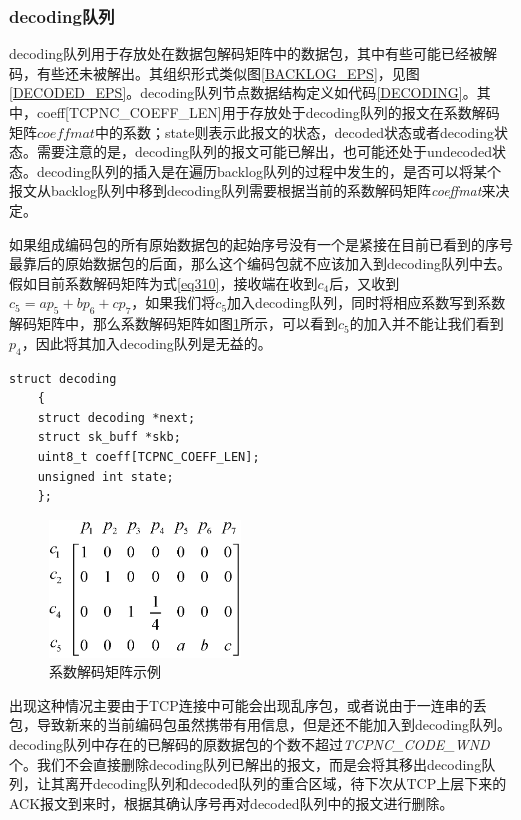 \subsubsection{\textbf{decoding队列}}
decoding队列用于存放处在数据包解码矩阵中的数据包，其中有些可能已经被解码，有些还未被解出。其组织形式类似图\ref{BACKLOG_EPS}，见图\ref{DECODED_EPS}。decoding队列节点数据结构定义如代码\ref{DECODING}。其中，coeff[TCPNC\_COEFF\_LEN]用于存放处于decoding队列的报文在系数解码矩阵$coeffmat$中的系数；state则表示此报文的状态，decoded状态或者decoding状态。需要注意的是，decoding队列的报文可能已解出，也可能还处于undecoded状态。decoding队列的插入是在遍历backlog队列的过程中发生的，是否可以将某个报文从backlog队列中移到decoding队列需要根据当前的系数解码矩阵\emph{coeffmat}来决定。
\par
如果组成编码包的所有原始数据包的起始序号没有一个是紧接在目前已看到的序号最靠后的原始数据包的后面，那么这个编码包就不应该加入到decoding队列中去。假如目前系数解码矩阵为式\ref{eq310}，接收端在收到$c_4$后，又收到$c_5=ap_{5}+bp_{6}+cp_{7}$，如果我们将$c_5$加入decoding队列，同时将相应系数写到系数解码矩阵中，那么系数解码矩阵如图\ref{IFADD_EPS}所示，可以看到$c_5$的加入并不能让我们看到$p_{4}$，因此将其加入decoding队列是无益的。
	\begin{lstlisting}[float,caption=decoding链表节点数据结构,label={DECODING},language={[ANSI]C}]
	struct decoding
	{
	struct decoding *next;
	struct sk_buff *skb;		
	uint8_t coeff[TCPNC_COEFF_LEN];
	unsigned int state;
	};
	\end{lstlisting}
\begin{figure}[htbp]
	\centering
	\includegraphics[width=2in]{figures/ifadd.eps}
	\caption{系数解码矩阵示例}
	\label{IFADD_EPS}
\end{figure}
出现这种情况主要由于TCP连接中可能会出现乱序包，或者说由于一连串的丢包，导致新来的当前编码包虽然携带有用信息，但是还不能加入到decoding队列。decoding队列中存在的已解码的原数据包的个数不超过\emph{TCPNC\_CODE\_WND}个。我们不会直接删除decoding队列已解出的报文，而是会将其移出decoding队列，让其离开decoding队列和decoded队列的重合区域，待下次从TCP上层下来的ACK报文到来时，根据其确认序号再对decoded队列中的报文进行删除。
